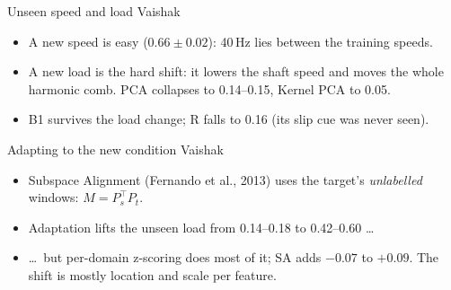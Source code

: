 \documentclass[aspectratio=169,11pt]{beamer}
\newcommand{\who}[1]{\hfill{\footnotesize\color{gray}#1}}
\newcommand{\tabfile}[1]{}
\begin{document}
\begin{frame}{Unseen speed and load \who{Vaishak}}
  \begin{center}\resizebox{0.95\textwidth}{!}{\tabfile{tab_ood.tex}}\end{center}
  \vspace{0.4em}
  \begin{itemize}
    \item A new speed is easy ($0.66 \pm 0.02$): 40\,Hz lies between the training speeds.
    \item A new load is the hard shift: it lowers the shaft speed and moves the whole harmonic
          comb. PCA collapses to 0.14--0.15, Kernel PCA to 0.05.
    \item B1 survives the load change; R falls to 0.16 (its slip cue was never seen).
  \end{itemize}
\end{frame}

\begin{frame}{Adapting to the new condition \who{Vaishak}}
  \begin{center}\resizebox{0.9\textwidth}{!}{\tabfile{tab_sa.tex}}\end{center}
  \vspace{0.4em}
  \begin{itemize}
    \item Subspace Alignment (Fernando et al., 2013) uses the target's \emph{unlabelled}
          windows: $M = P_s^\top P_t$.
    \item Adaptation lifts the unseen load from 0.14--0.18 to 0.42--0.60 \dots
    \item \dots\ but per-domain z-scoring does most of it; SA adds $-0.07$ to $+0.09$.
          The shift is mostly location and scale per feature.
  \end{itemize}
\end{frame}
\end{document}
